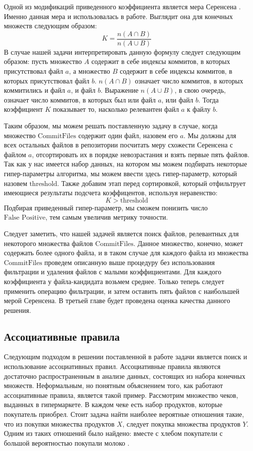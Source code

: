 Одной из модификаций приведенного коэффициента является мера Серенсена \cite{jacard2}. Именно данная мера и использовалась в работе. Выглядит она для конечных множеств следующим образом:
    $$K = \frac{n(A \cap B)}{n(A \cup B)}$$
В случае нашей задачи интерпретировать данную формулу следует следующим образом: пусть множество $A$ содержит в себе индексы коммитов, в которых присутствовал файл $a$, а множество $B$ содержит в себе индексы коммитов, в которых присутствовал файл $b$. $n(A \cap B)$ означает число коммитов, в которых коммитились и файл $a$, и файл $b$. Выражение $n(A \cup B)$, в свою очередь, означает число коммитов, в которых был или файл $a$, или файл $b$. Тогда коэффициент $K$ показывает то, насколько релевантен файл $a$ к файлу $b$. 

Таким образом, мы можем решать поставленную задачу в случае, когда множество $\text{CommitFiles}$ содержит один файл, назовем его $a$. Мы должны для всех остальных файлов в репозитории посчитать меру схожести Серенсена с файлом $a$, отсортировать их в порядке невозрастания и взять первые пять файлов. Так как у нас имеется набор данных, на котором мы можем подбирать некоторые гипер-параметры алгоритма, мы можем ввести здесь гипер-параметр, который назовем $\text{threshold}$. Также добавим этап перед сортировкой, который отфильтрует имеющиеся результаты подсчета коэффицентов, используя неравенство: 
    $$K > \text{threshold}$$
Подбирая приведенный гипер-параметр, мы сможем понизить число $\text{False Positive}$, тем самым увеличив метрику точности.

Следует заметить, что нашей задачей является поиск файлов, релевантных для некоторого множества файлов $\text{CommitFiles}$. Данное множество, конечно, может содержать более одного файла, и в таком случае для каждого файла из множества $\text{CommitFiles}$ проведем описанную выше процедуру без использования фильтрации и удаления файлов с малыми коэффициентами. Для каждого коэффициента у файла-кандидата возьмем среднее. Только теперь следует применить операцию фильтрации, и затем оставить пять файлов с наибольшей мерой Серенсена. В третьей главе будет проведена оценка качества данного решения.
    \subsection{Ассоциативные правила}\label{chapter2-rules}
Следующим подходом в решении поставленной в работе задачи является поиск и использование ассоциативных правил. Ассоциативные правила являются достаточно распространенным в анализе данных, состоящих из набора конечных множеств. Неформальным, но понятным объяснением того, как работают ассоциативные правила, является такой пример. Рассмотрим множество чеков, выданных в гипермаркете. В каждом чеке есть набор продуктов, которые покупатель приобрел. Стоит задача найти наиболее вероятные отношения такие, что из покупки множества продуктов $X$, следует покупка множества продуктов $Y$. Одним из таких отношений было найдено: вместе с хлебом покупатели с большой вероятностью покупали молоко \cite{as-rules}.
